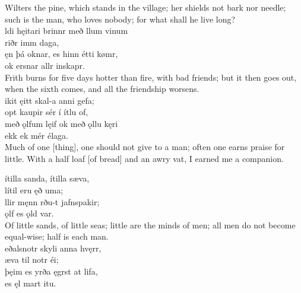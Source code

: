 \bvb Wilters the pine, which stands in the village; her shields not bark nor needle; such is the man, who loves nobody; for what shall he live long? \\

\bva {}ldi hęitari \hld brinnr með llum vinum \\%
\ind {}riðr imm daga, \\%
ęn þá oknar, \hld es hinn étti kømr, \\%
\ind ok ersnar allr inskapr.\\%

\bvb Frith burns for five days hotter than fire, with bad friends; but it then goes out, when the sixth comes, and all the friendship worsens. \\

\bva {}ikit ęitt \hld skal-a anni gefa; \\%
\ind opt kaupir sér í ítlu of, \\%
með ǫlfum lęif \hld ok með ǫllu kęri \\%
\ind {}ekk ek mér élaga.\\%

\bvb Much of one [thing], one should not give to a man; often one earns praise for little. With a half loaf [of bread] and an awry vat, I earned me a companion. \\

\bva {}ítilla sanda, \hld {}ítilla sæva, \\%
\ind lítil eru ęð uma; \\%
llir męnn \hld {}rðu-t jafnspakir; \\%
\ind {}ǫlf es ǫld var.\\%

\bvb Of little sands, of little seas; little are the minds of men; all men do not become equal-wise; half is each man. \\

\bva {}eðalsnotr \hld skyli anna hvęrr, \\%
\ind æva til notr éi; \\%
þęim es yrða \hld {}ęgrst at lifa, \\%
\ind es ęl mart itu.\\%

